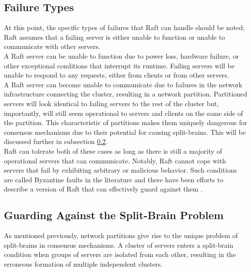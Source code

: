 \subsection{Failure Types}

At this point, the specific types of failures that Raft can handle should be noted; Raft assumes that a failing server is either unable to function or unable to communicate with other servers.\\

A Raft server can be unable to function due to power loss, hardware failure, or other exceptional conditions that interrupt its runtime. Failing servers will be unable to respond to any requests, either from clients or from other servers.\\

A Raft server can become unable to communicate due to failures in the network infrastructure connecting the cluster, resulting in a network partition. Partitioned servers will look identical to failing servers to the rest of the cluster but, importantly, will still seem operational to servers and clients on the same side of the partition. This characteristic of partitions makes them uniquely dangerous for consensus mechanisms due to their potential for causing split-brains. This will be discussed further in subsection \ref{split-brains}.\\

Raft can tolerate both of these cases as long as there is still a majority of operational servers that can communicate. Notably, Raft cannot cope with servers that fail by exhibiting arbitrary or malicious behavior. Such conditions are called Byzantine faults in the literature and there have been efforts to describe a version of Raft that can effectively guard against them \cite{tian2021byzantine,xie2022raft,zhou2021vg,copeland2016tangaroa}. \\

\subsection{Guarding Against the Split-Brain Problem} \label{split-brains}

As mentioned previously, network partitions give rise to the unique problem of split-brains in consensus mechanisms. A cluster of servers enters a split-brain condition when groups of servers are isolated from each other, resulting in the erroneous formation of multiple independent clusters.\\

